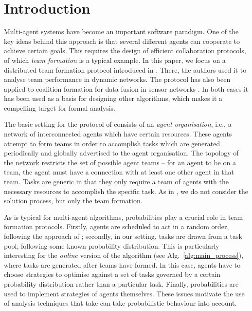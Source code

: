 \documentclass{llncs}
\newcommand{\taolue}[1]{\marginpar{\footnotesize \color{blue} {\bf TL:} \textsf{#1}}}
\begin{document}
\section{Introduction}
Multi-agent systems have become an important software paradigm. One of the
key ideas behind this approach is that several different agents can cooperate to achieve certain goals.
This requires the design of efficient collaboration protocols, of which \emph{team formation} is a typical example. In this paper, we focus on a distributed team formation protocol introduced in \cite{gaston2005agent}. There, the authors used it to analyse team performance in dynamic networks.
The protocol %
has also been applied to coalition formation for data fusion in sensor networks \cite{glinton2008agent}. In both cases it has been used as a basis for designing other algorithms, which makes it a compelling target for formal analysis.

The basic setting for the protocol of \cite{gaston2005agent} consists of an \emph{agent organisation}, i.e., a network of interconnected agents which have certain resources. These agents attempt to form teams in order to accomplish tasks which are generated periodically and globally advertised to the agent organisation. The topology of the network restricts the set of possible agent teams -- for an agent to be on a team, the agent must have a connection with at least one other agent in that team. Tasks are generic in that they only require a team of agents with the necessary resources to accomplish the specific task. As in \cite{gaston2005agent}, we do not consider the solution process, but only the team formation.

As is typical for multi-agent algorithms, probabilities play a crucial role in team formation protocols. %
Firstly, agents are scheduled to act in a random order, following the approach of
\cite{gaston2005agent}; secondly, in our setting, tasks are drawn from a task pool, following some known probability distribution. This is particularly interesting for the \emph{online} version of the algorithm (see Alg.~\ref{alg:main_process}), where tasks are generated after teams have formed.
In this case, agents have to choose strategies to optimise against a set of tasks governed by a certain probability distribution rather than a particular task.
Finally, probabilities are used to implement strategies of agents themselves.
These issues motivate the use of analysis techniques that take
can take probabilistic behaviour into account.
\end{document}
